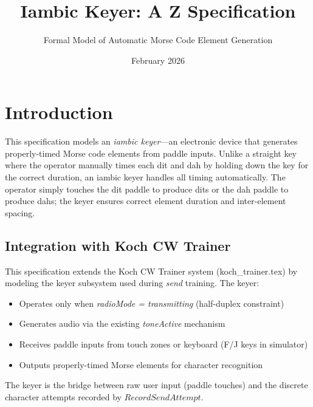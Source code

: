 \documentclass[a4paper,10pt,fleqn]{article}
\begin{document}
\title{Iambic Keyer: A Z Specification}
\author{Formal Model of Automatic Morse Code Element Generation}
\date{February 2026}
\maketitle

\tableofcontents
\newpage

\section{Introduction}

This specification models an \emph{iambic keyer}---an electronic device that
generates properly-timed Morse code elements from paddle inputs. Unlike a
straight key where the operator manually times each dit and dah by holding
down the key for the correct duration, an iambic keyer handles all timing
automatically. The operator simply touches the dit paddle to produce dits
or the dah paddle to produce dahs; the keyer ensures correct element duration
and inter-element spacing.

\subsection{Integration with Koch CW Trainer}

This specification extends the Koch CW Trainer system (koch\_trainer.tex) by
modeling the keyer subsystem used during \emph{send} training. The keyer:

\begin{itemize}
\item Operates only when \emph{radioMode = transmitting} (half-duplex constraint)
\item Generates audio via the existing \emph{toneActive} mechanism
\item Receives paddle inputs from touch zones or keyboard (F/J keys in simulator)
\item Outputs properly-timed Morse elements for character recognition
\end{itemize}

The keyer is the bridge between raw user input (paddle touches) and the
discrete character attempts recorded by $RecordSendAttempt$.
\end{document}
